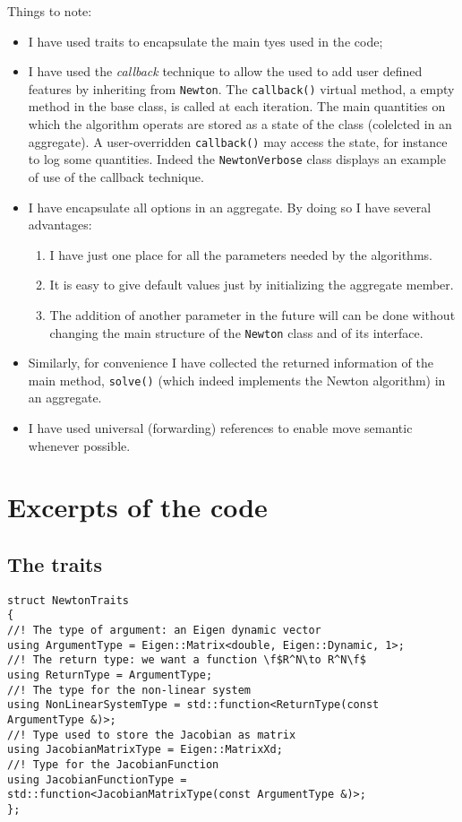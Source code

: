 \documentclass{article}
\newcommand{\li}{\lstinline}
\newcommand{\cpp}[1]{\li!#1!}
\begin{document}
Things to note:
\begin{itemize}
    \item I have used traits to encapsulate the main tyes used in the code;
    \item I have used the \emph{callback} technique to allow the used to add user defined features by inheriting from \cpp{Newton}. The \cpp{callback()} virtual method, a empty method in the base class, is called at each iteration. The main quantities on which the algorithm operats are stored as a state of the class (colelcted in an aggregate). A user-overridden \cpp{callback()} may access the state, for instance to log some quantities. Indeed the \cpp{NewtonVerbose} class displays an example of use of the callback technique. 
    \item I have encapsulate all options in an aggregate. By doing so I have several advantages:
    \begin{enumerate}
        \item I have just one place for all the parameters needed by the algorithms. 
        \item It is easy to give default values just by initializing the aggregate member.
        \item The addition of another parameter in the future will can be done without changing the main structure of the \cpp{Newton} class and of its interface.
    \end{enumerate}
\item Similarly, for convenience I have collected the returned information of the main method, \cpp{solve()} (which indeed implements the Newton algorithm) in an aggregate.
\item I have used universal (forwarding) references to enable move semantic whenever possible. 
\end{itemize}
\section{Excerpts of the code}
\subsection{The traits}
\begin{lstlisting}
struct NewtonTraits
{
//! The type of argument: an Eigen dynamic vector
using ArgumentType = Eigen::Matrix<double, Eigen::Dynamic, 1>;
//! The return type: we want a function \f$R^N\to R^N\f$
using ReturnType = ArgumentType;
//! The type for the non-linear system
using NonLinearSystemType = std::function<ReturnType(const ArgumentType &)>;
//! Type used to store the Jacobian as matrix
using JacobianMatrixType = Eigen::MatrixXd;
//! Type for the JacobianFunction
using JacobianFunctionType =
std::function<JacobianMatrixType(const ArgumentType &)>;
};
\end{lstlisting}
\end{document}
